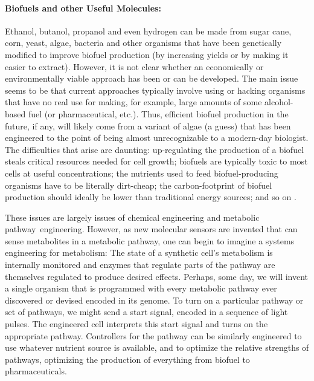\paragraph{Biofuels and other Useful Molecules:} Ethanol, butanol,
propanol and even hydrogen can be made from sugar cane, corn, yeast,
algae, bacteria and other organisms that have been genetically
modified to improve biofuel production (by increasing yields or by
making it easier to extract). However, it is not clear whether an
economically or environmentally viable approach has been or can be
developed. The main issue seems to be that current approaches
typically involve using or hacking organisms that have no real use for
making, for example, large amounts of some alcohol-based fuel (or
pharmaceutical, etc.). Thus, efficient biofuel production in the
future, if any, will likely come from a variant of algae
\cite{algae-biofuel} (a guess) that has been engineered to the point
of being almost unrecognizable to a modern-day biologist. The
difficulties that arise are daunting: up-regulating the production of
a biofuel steals critical resources needed for cell growth; biofuels
are typically toxic to most cells at useful concentrations; the
nutrients used to feed biofuel-producing organisms have to be
literally dirt-cheap; the carbon-footprint of biofuel production
should ideally be lower than traditional energy sources; and so on
\cite{biofuel-issues}.

These issues are largely issues of chemical engineering and metabolic
pathway\footnotemark\ engineering\cite{pathway-engineering}. However,
as new molecular sensors are invented that can sense metabolites in a
metabolic pathway, one can begin to imagine a systems engineering for
metabolism: The state of a synthetic cell's metabolism is internally
monitored and enzymes that regulate parts of the pathway are
themselves regulated to produce desired effects. Perhaps, some day, we
will invent a single organism that is programmed with every metabolic
pathway ever discovered or devised encoded in its genome. To turn on
a particular pathway or set of pathways, we might send a start signal,
encoded in a sequence of light pulses. The engineered cell interprets
this start signal and turns on the appropriate pathway. Controllers
for the pathway can be similarly engineered to use whatever nutrient
source is available, and to optimize the relative strengths of
pathways, optimizing the production of everything from biofuel to
pharmaceuticals.

